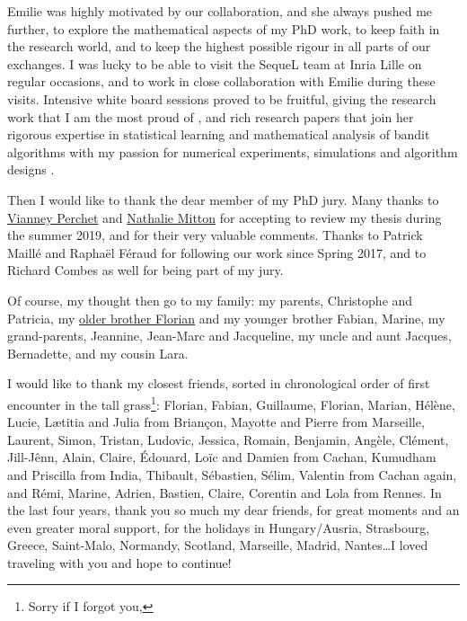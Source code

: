 \begin{acknowledgements}
Emilie was highly motivated by our collaboration, and she always pushed me further, to explore the mathematical aspects of my PhD work, to keep faith in the research world, and to keep the highest possible rigour in all parts of our exchanges.
I was lucky to be able to visit the SequeL team at Inria Lille on regular occasions, and to work in close collaboration with Emilie during these visits. Intensive white board sessions proved to be fruitful, giving the research work that I am the most proud of \cite{Besson2018ALT}, and rich research papers that join her rigorous expertise in statistical learning and mathematical analysis of bandit algorithms with my passion for numerical experiments, simulations and algorithm designs \cite{Besson2018ALT,Besson2018DoublingTricks,Besson2019GLRT}.

Then I would like to thank the dear member of my PhD jury.
Many thanks to \href{https://sites.google.com/site/vianneyperchet/}{Vianney Perchet} and \href{http://researchers.lille.inria.fr/~mitton/}{Nathalie Mitton} for accepting to review my thesis during the summer 2019, and for their very valuable comments.
Thanks to Patrick Maillé and Raphaël Féraud for following our work since Spring 2017,
and to Richard Combes as well for being part of my jury.

Of course, my thought then go to my family: my parents, Christophe and Patricia, my \href{https://paris-sorbonne.academia.edu/FBesson}{older brother Florian} and my younger brother Fabian, Marine, my grand-parents, Jeannine, Jean-Marc and Jacqueline, my uncle and aunt Jacques, Bernadette, and my cousin Lara.

I would like to thank my closest friends, sorted in chronological order of first encounter in the tall grass\footnote{Sorry if I forgot you, }: Florian, Fabian, Guillaume, Florian, Marian, Hélène, Lucie, Lætitia and Julia from Briançon, Mayotte and Pierre from Marseille, Laurent, Simon, Tristan, Ludovic, Jessica, Romain, Benjamin, Angèle, Clément, Jill-Jênn, Alain, Claire, Édouard, Loïc and Damien from Cachan, Kumudham and Priscilla from India, Thibault, Sébastien, Sélim, Valentin from Cachan again, and Rémi, Marine, Adrien, Bastien, Claire, Corentin and Lola from Rennes.
In the last four years, thank you so much my dear friends, for great moments and an even greater moral support, for the holidays in Hungary/Ausria, Strasbourg, Greece, Saint-Malo, Normandy, Scotland, Marseille, Madrid, Nantes\dots I loved traveling with you and hope to continue!


\end{acknowledgements}
